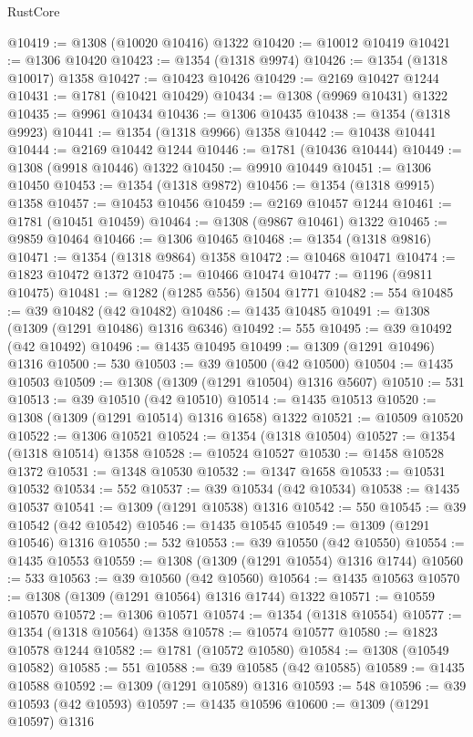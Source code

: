 \begin{lexlean}{RustCore}
\begin{coremodule}
@10419 := @1308 (@10020 @10416) @1322
@10420 := @10012 @10419
@10421 := @1306 @10420
@10423 := @1354 (@1318 @9974)
@10426 := @1354 (@1318 @10017) @1358
@10427 := @10423 @10426
@10429 := @2169 @10427 @1244
@10431 := @1781 (@10421 @10429)
@10434 := @1308 (@9969 @10431) @1322
@10435 := @9961 @10434
@10436 := @1306 @10435
@10438 := @1354 (@1318 @9923)
@10441 := @1354 (@1318 @9966) @1358
@10442 := @10438 @10441
@10444 := @2169 @10442 @1244
@10446 := @1781 (@10436 @10444)
@10449 := @1308 (@9918 @10446) @1322
@10450 := @9910 @10449
@10451 := @1306 @10450
@10453 := @1354 (@1318 @9872)
@10456 := @1354 (@1318 @9915) @1358
@10457 := @10453 @10456
@10459 := @2169 @10457 @1244
@10461 := @1781 (@10451 @10459)
@10464 := @1308 (@9867 @10461) @1322
@10465 := @9859 @10464
@10466 := @1306 @10465
@10468 := @1354 (@1318 @9816)
@10471 := @1354 (@1318 @9864) @1358
@10472 := @10468 @10471
@10474 := @1823 @10472 @1372
@10475 := @10466 @10474
@10477 := @1196 (@9811 @10475)
@10481 := @1282 (@1285 @556) @1504 @1771
@10482 := 554
@10485 := @39 @10482 (@42 @10482)
@10486 := @1435 @10485
@10491 := @1308 (@1309 (@1291 @10486) @1316 @6346)
@10492 := 555
@10495 := @39 @10492 (@42 @10492)
@10496 := @1435 @10495
@10499 := @1309 (@1291 @10496) @1316
@10500 := 530
@10503 := @39 @10500 (@42 @10500)
@10504 := @1435 @10503
@10509 := @1308 (@1309 (@1291 @10504) @1316 @5607)
@10510 := 531
@10513 := @39 @10510 (@42 @10510)
@10514 := @1435 @10513
@10520 := @1308 (@1309 (@1291 @10514) @1316 @1658) @1322
@10521 := @10509 @10520
@10522 := @1306 @10521
@10524 := @1354 (@1318 @10504)
@10527 := @1354 (@1318 @10514) @1358
@10528 := @10524 @10527
@10530 := @1458 @10528 @1372
@10531 := @1348 @10530
@10532 := @1347 @1658
@10533 := @10531 @10532
@10534 := 552
@10537 := @39 @10534 (@42 @10534)
@10538 := @1435 @10537
@10541 := @1309 (@1291 @10538) @1316
@10542 := 550
@10545 := @39 @10542 (@42 @10542)
@10546 := @1435 @10545
@10549 := @1309 (@1291 @10546) @1316
@10550 := 532
@10553 := @39 @10550 (@42 @10550)
@10554 := @1435 @10553
@10559 := @1308 (@1309 (@1291 @10554) @1316 @1744)
@10560 := 533
@10563 := @39 @10560 (@42 @10560)
@10564 := @1435 @10563
@10570 := @1308 (@1309 (@1291 @10564) @1316 @1744) @1322
@10571 := @10559 @10570
@10572 := @1306 @10571
@10574 := @1354 (@1318 @10554)
@10577 := @1354 (@1318 @10564) @1358
@10578 := @10574 @10577
@10580 := @1823 @10578 @1244
@10582 := @1781 (@10572 @10580)
@10584 := @1308 (@10549 @10582)
@10585 := 551
@10588 := @39 @10585 (@42 @10585)
@10589 := @1435 @10588
@10592 := @1309 (@1291 @10589) @1316
@10593 := 548
@10596 := @39 @10593 (@42 @10593)
@10597 := @1435 @10596
@10600 := @1309 (@1291 @10597) @1316

\end{coremodule}
\end{lexlean}

